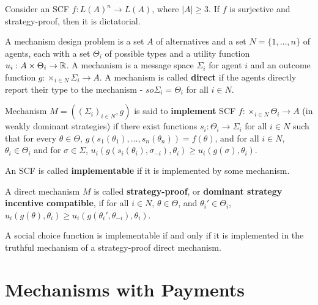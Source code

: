 \begin{thm}
  \label{sec:mecahnism-design-2}
  Consider an SCF $f: L(A)^{n} \rightarrow L(A)$, where $|A| \geq 3$.
  If $f$ is surjective and strategy-proof, then it is dictatorial.
\end{thm}


\begin{defn}
  \label{sec:mecahnism-design-4}
  A mechanism design problem is a set $A$ of alternatives and a set $N
  = \{ 1, \dots, n \} $ of agents, each with a set $\Theta_{i}$ of
  possible types and a utility function $u_{i}: A \times \Theta_{i}
  \rightarrow \mathbb{R}$.  A mechanism is a message space $\Sigma_{i}$ for
  agent $i$ and an outcome function $g: \times_{i \in N} \Sigma_{i}
  \rightarrow A$.  A mechanism is called \textbf{direct} if the agents
  directly report their type to the mechanism - $so \Sigma_{i} =
  \Theta_{i}$ for all $i \in N$.

  Mechanism $M =((\Sigma_{i})_{i \in N}, g)$ is said to
  \textbf{implement} SCF $f: \times_{i \in N} \Theta_{i} \rightarrow
  A$ (in weakly dominant strategies) if there exist functions $s_{i}:
  \Theta_{i} \rightarrow \Sigma_{i}$ for all $i \in N$ such that for
  every $\theta \in \Theta$, $g(s_{1}(\theta_{1}), \dots,
  s_{n}(\theta_{n})) = f(\theta)$, and for all $i \in N$, $\theta_{i}
  \in \Theta_{i}$ and for $\sigma \in \Sigma$,
  $u_{i}(g(s_{i}(\theta_{i}), \sigma_{-i}), \theta_{i}) \geq
  u_{i}(g(\sigma), \theta_{i})$.

  An SCF is called \textbf{implementable} if it is implemented by some
  mechanism.

  A direct mechanism $M$ is called \textbf{strategy-proof}, or
  \textbf{dominant strategy incentive compatible}, if for all $i \in
  N$, $\theta \in \Theta$, and $\theta_{i}' \in \Theta_{i}$,
  $u_{i}(g(\theta), \theta_{i}) \geq u_{i}(g(\theta_{i}',
  \theta_{-i}), \theta_{i})$.
\end{defn}

\begin{thm}
  \label{sec:mecahnism-design-3}
  A social choice function is implementable if and only if it is
  implemented in the truthful mechanism of a strategy-proof direct mechanism.
\end{thm}

\section{Mechanisms with Payments}
\label{sec:mech-with-paym}

